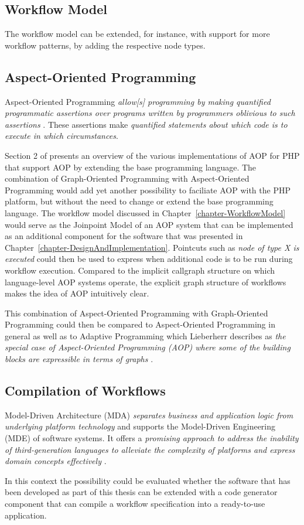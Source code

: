 \subsection{Workflow Model}

The workflow model can be extended, for instance, with support for more
workflow patterns, by adding the respective node types.

\subsection{Aspect-Oriented Programming}

Aspect-Oriented Programming \emph{allow[s] programming by making quantified
programmatic assertions over programs written by programmers oblivious to
such assertions} \cite{RF00}. These assertions make \emph{quantified
statements about which code is to execute in which circumstances}.

Section 2 of \cite{SB06} presents an overview of the various implementations
of AOP for PHP that support AOP by extending the base programming language.
The combination of Graph-Oriented Programming with Aspect-Oriented Programming
would add yet another possibility to faciliate AOP with the PHP platform, but
without the need to change or extend the base programming language. The
workflow model discussed in Chapter~\ref{chapter-WorkflowModel} would serve as
the Joinpoint Model of an AOP system that can be implemented as an additional
component for the software that was presented in
Chapter~\ref{chapter-DesignAndImplementation}. Pointcuts such as \emph{node of
type X is executed} could then be used to express when additional code is to
be run during workflow execution. Compared to the implicit callgraph structure
on which language-level AOP systems operate, the explicit graph structure of
workflows makes the idea of AOP intuitively clear.

This combination of Aspect-Oriented Programming with Graph-Oriented Programming
could then be compared to Aspect-Oriented Programming in general as well as
to Adaptive Programming which Lieberherr describes as \emph{the special case of
Aspect-Oriented Programming (AOP) where some of the building blocks are
expressible in terms of graphs} \cite{KL97}.

\subsection{Compilation of Workflows}

Model-Driven Architecture (MDA) \emph{separates business and application logic
from underlying platform technology} \cite{JM01} and supports the Model-Driven
Engineering (MDE) of software systems. It offers a \emph{promising approach to
address the inability of third-generation languages to alleviate the complexity
of platforms and express domain concepts effectively} \cite{DS06}.

In this context the possibility could be evaluated whether the software that
has been developed as part of this thesis can be extended with a code
generator component that can compile a workflow specification into a
ready-to-use application.
